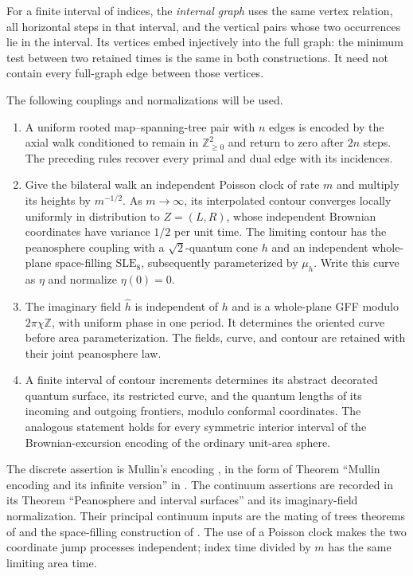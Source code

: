 For a finite interval of indices, the \emph{internal graph} uses the
same vertex relation, all horizontal steps in that interval, and the
vertical pairs whose two occurrences lie in the interval.  Its vertices
embed injectively into the full graph: the minimum test between two
retained times is the same in both constructions.  It need not contain
every full-graph edge between those vertices.

\begin{proposition}\label{inp:sewing}
The following couplings and normalizations will be used.
\begin{enumerate}
\item A uniform rooted map--spanning-tree pair with $n$ edges is encoded
by the axial walk conditioned to remain in $\mathbb Z_{\ge0}^2$ and
return to zero after $2n$ steps.  The preceding rules recover every
primal and dual edge with its incidences.
\item Give the bilateral walk an independent Poisson clock of rate
$m$ and multiply its heights by $m^{-1/2}$.  As $m\to\infty$, its
interpolated contour converges locally uniformly in distribution to
$Z=(L,R)$, whose independent Brownian coordinates have variance
$1/2$ per unit time.  The limiting contour has the peanosphere coupling
with a $\sqrt2$-quantum cone $h$ and an independent whole-plane
space-filling $\mathrm{SLE}_8$, subsequently parameterized by $\mu_h$.
Write this curve as $\eta$ and normalize $\eta(0)=0$.
\item The imaginary field $\widehat h$ is independent of $h$ and is a
whole-plane GFF modulo $2\pi\chi\mathbb Z$, with uniform phase in
one period.  It determines the oriented curve before area
parameterization.  The fields, curve, and contour are retained with
their joint peanosphere law.
\item A finite interval of contour increments determines its abstract
decorated quantum surface, its restricted curve, and the quantum lengths
of its incoming and outgoing frontiers, modulo conformal coordinates.
The analogous statement holds for every symmetric interior interval
of the Brownian-excursion encoding of the ordinary unit-area sphere.
\end{enumerate}
\end{proposition}

The discrete assertion is Mullin's encoding \cite{Mullin}, in the form
of Theorem ``Mullin encoding and its infinite version'' in
\cite{MetricMaps}.  The continuum assertions are recorded in its
Theorem ``Peanosphere and interval surfaces'' and its imaginary-field
normalization.  Their principal continuum inputs are the mating of
trees theorems of \cite[Theorems~1.9 and~1.11]{DMS} and the
space-filling construction of \cite{IG4}.
The use of a Poisson clock makes the two coordinate jump processes
independent; index time divided by $m$ has the same limiting area time.

